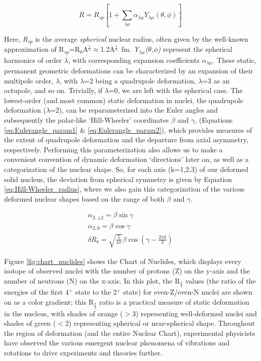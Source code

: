 \begin{equation}\label{eq:def_radius}
R=R_{sp} [1+\sum_{\lambda\mu} \alpha_{\lambda\mu} Y_{\lambda\mu}(\theta,\phi)]
\end{equation}

Here, \textit{R$_{sp}$} is the average \textit{spherical} nuclear radius, often given by the well-known approximation of R$_{sp}$=R$_0$A$^{\frac{1}{3}}\approx$1.2A$^{\frac{1}{3}}$~fm. \textit{Y$_{\lambda\mu}$($\theta$,$\phi$)} represent the spherical harmonics of order $\lambda$, with corresponding expansion coefficients \textit{$\alpha_{\lambda\mu}$}. These static, permanent geometric deformations can be characterized by an expansion of their multipole order, \textit{$\lambda$}, with $\lambda$=2 being a quadrupole deformation, $\lambda$=3 as an octupole, and so on. Trivially, if $\lambda$=0, we are left with the spherical case. The lowest-order (and most common) static deformation in nuclei, the quadrupole deformation ($\lambda$=2), can be reparameterized into the Euler angles and subsequently the polar-like `Hill-Wheeler' coordinates \textit{$\beta$} and \textit{$\gamma$}, (Equations \ref{eq:Eulerangle_param1} \& \ref{eq:Eulerangle_param2}), which provides measures of the extent of quadrupole deformation and the departure from axial asymmetry, respectively. Performing this parameterization also allows us to make a convenient convention of dynamic deformation `directions' later on, as well as a categorization of the nuclear shape. So, for each axis (k=1,2,3) of our deformed solid nucleus, the deviation from spherical symmetry is given by Equation \ref{eq:Hill-Wheeler_radius}, where we also gain this categorization of the various deformed nuclear shapes based on the range of both \textit{$\beta$} and \textit{$\gamma$}. 

\begin{align}
\alpha_{2,\pm2}=\beta\sin\gamma \label{eq:Eulerangle_param1}\\
\alpha_{2,0}=\beta\cos\gamma \label{eq:Eulerangle_param2}\\
\delta R_k=\sqrt{\frac{5}{4\pi}}\beta\cos(\gamma-\frac{2\pi k}{3}) \label{eq:Hill-Wheeler_radius}
\end{align}

Figure \ref{fig:chart_nuclides} shows the Chart of Nuclides, which displays every isotope of observed nuclei with the number of protons (Z) on the y-axis and the number of neutrons (N) on the x-axis. In this plot, the R$_{\frac{4}{2}}$ values (the ratio of the energies of the first 4$^+$ state to the 2$^+$ state) for even-Z/even-N nuclei are shown on as a color gradient; this R$_{\frac{4}{2}}$ ratio is a practical measure of static deformation in the nucleus, with shades of orange ($>$3) representing well-deformed nuclei and shades of green ($<$2) representing spherical or near-spherical shape. Throughout the region of deformation (and the entire Nuclear Chart), experimental physicists have observed the various emergent nuclear phenomena of vibrations and rotations to drive experiments and theories further.

